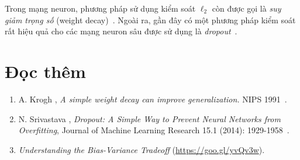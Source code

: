 
Trong mạng neuron, phương pháp sử dụng kiểm soát $\ell_2$ còn được gọi là \textit{suy giảm trọng số} (weight decay)~\cite{krogh1992simple}. Ngoài ra, gần đây có một phương pháp kiểm soát rất hiệu quả cho các mạng neuron sâu được sử dụng là \textit{dropout}~\cite{srivastava2014dropout}.

\section{Đọc thêm}
\begin{enumerate}
\item A. Krogh \etal, \textit{A simple weight decay can improve generalization.} NIPS 1991~\cite{krogh1992simple}.

\item N. Srivastava \etal, \textit{Dropout: A Simple Way to Prevent Neural
Networks from  Overfitting}, Journal of Machine Learning Research 15.1
(2014): 1929-1958~\cite{srivastava2014dropout}.

\item \textit{Understanding the Bias-Variance Tradeoff} (\url{https://goo.gl/yvQv3w}).

\end{enumerate}
